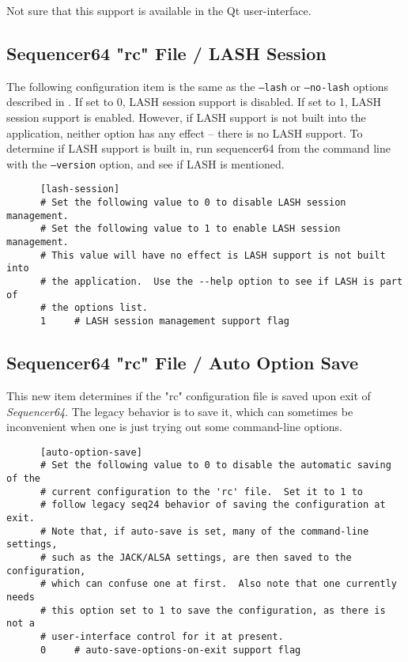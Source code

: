    Not sure that this support is available in the Qt user-interface.

\subsection{Sequencer64 "rc" File / LASH Session}
\label{subsec:seq64_rc_file_lash_session}

   The following configuration item is the same as the
   \texttt{--lash} or \texttt{--no-lash} options described in
   .
   If set to 0, LASH session support is disabled.
   If set to 1, LASH session support is enabled.
   However, if LASH support is not built into the application, neither option
   has any effect -- there is no LASH support.  
   To determine if LASH support is built in, run sequencer64 from the command
   line with the \texttt{--version} option, and see if LASH is mentioned.

   \begin{verbatim}
      [lash-session]
      # Set the following value to 0 to disable LASH session management.
      # Set the following value to 1 to enable LASH session management.
      # This value will have no effect is LASH support is not built into
      # the application.  Use the --help option to see if LASH is part of
      # the options list.
      1     # LASH session management support flag
   \end{verbatim}

\subsection{Sequencer64 "rc" File / Auto Option Save}
\label{subsec:seq64_rc_file_auto_rc_save}

   This new item determines if the "rc" configuration file is saved
   upon exit of \textsl{Sequencer64}.  The legacy behavior is to save it,
   which can sometimes be inconvenient when one is just trying out some
   command-line options.

   \begin{verbatim}
      [auto-option-save]
      # Set the following value to 0 to disable the automatic saving of the
      # current configuration to the 'rc' file.  Set it to 1 to
      # follow legacy seq24 behavior of saving the configuration at exit.
      # Note that, if auto-save is set, many of the command-line settings,
      # such as the JACK/ALSA settings, are then saved to the configuration,
      # which can confuse one at first.  Also note that one currently needs
      # this option set to 1 to save the configuration, as there is not a
      # user-interface control for it at present.
      0     # auto-save-options-on-exit support flag
   \end{verbatim}


